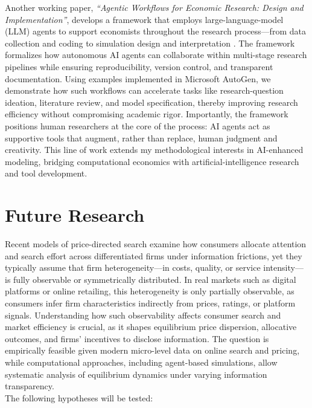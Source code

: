 \documentclass{nfr}
\begin{document}
Another working paper, \textit{``Agentic Workflows for Economic Research: Design and Implementation''}, develops a framework that employs large-language-model (LLM) agents to support economists throughout the research process—from data collection and coding to simulation design and interpretation \citep{Dawid2025}. The framework formalizes how autonomous AI agents can collaborate within multi-stage research pipelines while ensuring reproducibility, version control, and transparent documentation. Using examples implemented in Microsoft AutoGen, we demonstrate how such workflows can accelerate tasks like research-question ideation, literature review, and model specification, thereby improving research efficiency without compromising academic rigor. Importantly, the framework positions human researchers at the core of the process: AI agents act as supportive tools that augment, rather than replace, human judgment and creativity. This line of work extends my methodological interests in AI-enhanced modeling, bridging computational economics with artificial-intelligence research and tool development.

\section*{Future Research}

Recent models of price-directed search \citep{obradovits2023price} examine how consumers allocate attention and search effort across differentiated firms under information frictions, yet they typically assume that firm heterogeneity---in costs, quality, or service intensity---is fully observable or symmetrically distributed. In real markets such as digital platforms or online retailing, this heterogeneity is only partially observable, as consumers infer firm characteristics indirectly from prices, ratings, or platform signals. Understanding how such observability affects consumer search and market efficiency is crucial, as it shapes equilibrium price dispersion, allocative outcomes, and firms’ incentives to disclose information. The question is empirically feasible given modern micro-level data on online search and pricing, while computational approaches, including agent-based simulations, allow systematic analysis of equilibrium dynamics under varying information transparency. \\

The following hypotheses will be tested:
\end{document}

